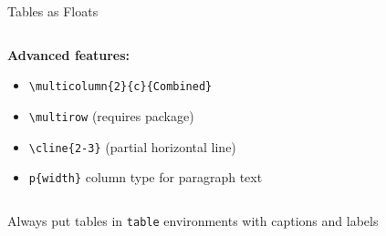\begin{frame}[fragile]{Tables as Floats}
\begin{columns}
\begin{column}{0.5\textwidth}
			\textbf{Advanced features:}
			\begin{itemize}
				\item \texttt{\textbackslash multicolumn\{2\}\{c\}\{Combined\}}
				\item \texttt{\textbackslash multirow} (requires package)
				\item \texttt{\textbackslash cline\{2-3\}} (partial horizontal line)
				\item \texttt{p\{width\}} column type for paragraph text
			\end{itemize}
		\end{column}
	\end{columns}
	
	\begin{tip}
		Always put tables in \texttt{table} environments with captions and labels
	\end{tip}
\end{frame}

